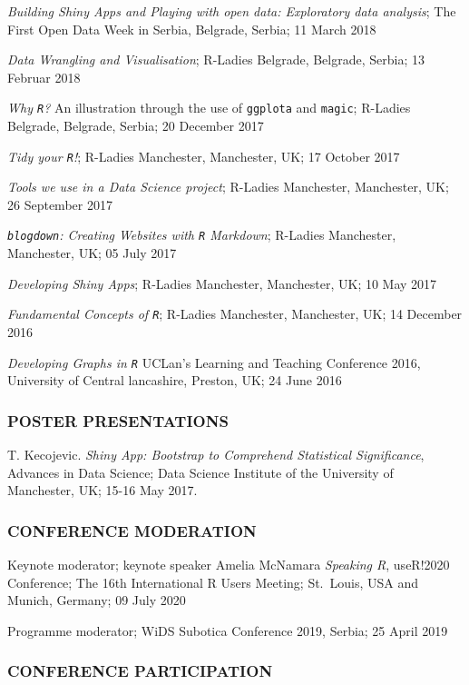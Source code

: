 \documentclass[
]{article}
\begin{document}
\emph{Building Shiny Apps and Playing with open data: Exploratory data
analysis}; The First Open Data Week in Serbia, Belgrade, Serbia; 11
March 2018

\emph{Data Wrangling and Visualisation}; R-Ladies Belgrade, Belgrade,
Serbia; 13 Februar 2018

\emph{Why \texttt{R}?} An illustration through the use of
\texttt{ggplota} and \texttt{magic}; R-Ladies Belgrade, Belgrade,
Serbia; 20 December 2017

\emph{Tidy your \texttt{R}!}; R-Ladies Manchester, Manchester, UK; 17
October 2017

\emph{Tools we use in a Data Science project}; R-Ladies Manchester,
Manchester, UK; 26 September 2017

\emph{\texttt{blogdown}: Creating Websites with \texttt{R} Markdown};
R-Ladies Manchester, Manchester, UK; 05 July 2017

\emph{Developing Shiny Apps}; R-Ladies Manchester, Manchester, UK; 10
May 2017

\emph{Fundamental Concepts of \texttt{R}}; R-Ladies Manchester,
Manchester, UK; 14 December 2016

\emph{Developing Graphs in \texttt{R}} UCLan's Learning and Teaching
Conference 2016, University of Central lancashire, Preston, UK; 24 June
2016

\hypertarget{poster-presentations}{%
\subsubsection{POSTER PRESENTATIONS}\label{poster-presentations}}

T. Kecojevic. \emph{Shiny App: Bootstrap to Comprehend Statistical
Significance}, Advances in Data Science; Data Science Institute of the
University of Manchester, UK; 15-16 May 2017.

\hypertarget{conference-moderation}{%
\subsubsection{CONFERENCE MODERATION}\label{conference-moderation}}

Keynote moderator; keynote speaker Amelia McNamara \emph{Speaking R},
useR!2020 Conference; The 16th International R Users Meeting; St.~Louis,
USA and Munich, Germany; 09 July 2020

Programme moderator; WiDS Subotica Conference 2019, Serbia; 25 April
2019

\hypertarget{conference-participation}{%
\subsubsection{CONFERENCE
PARTICIPATION}\label{conference-participation}}
\end{document}
